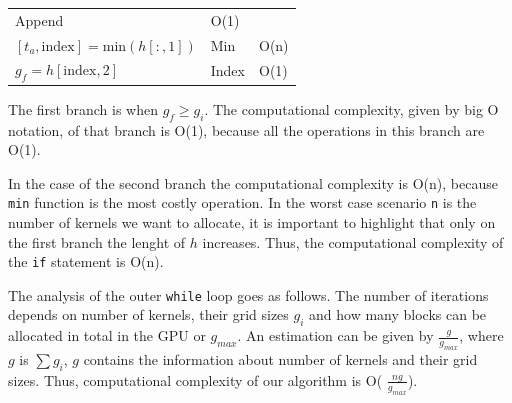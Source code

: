 \documentclass[
  12pt,
  a4paperpaper,
]{report}
\begin{document}
\begin{longtable}[]{@{}lll@{}}
\begin{minipage}[t]{0.24\columnwidth}
Append\strut
\end{minipage} & \begin{minipage}[t]{0.15\columnwidth}\raggedright
O(1)\strut
\end{minipage}\tabularnewline
\begin{minipage}[t]{0.52\columnwidth}\raggedright
\([ t_a, \mathrm{index}] = \mathrm{min}( h[:,1] )\)\strut
\end{minipage} & \begin{minipage}[t]{0.24\columnwidth}\raggedright
Min\strut
\end{minipage} & \begin{minipage}[t]{0.15\columnwidth}\raggedright
O(n)\strut
\end{minipage}\tabularnewline
\begin{minipage}[t]{0.52\columnwidth}\raggedright
\(g_f = h[ \mathrm{index}, 2]\)\strut
\end{minipage} & \begin{minipage}[t]{0.24\columnwidth}\raggedright
Index\strut
\end{minipage} & \begin{minipage}[t]{0.15\columnwidth}\raggedright
O(1)\strut
\end{minipage}\tabularnewline
\bottomrule
\end{longtable}

The first branch is when \(g_f \geq g_i\). The computational complexity,
given by big O notation, of that branch is O(1), because all the
operations in this branch are O(1).

In the case of the second branch the computational complexity is O(n),
because \texttt{min} function is the most costly operation. In the worst
case scenario \texttt{n} is the number of kernels we want to allocate,
it is important to highlight that only on the first branch the lenght of
\(h\) increases. Thus, the computational complexity of the \texttt{if}
statement is O(n).

The analysis of the outer \texttt{while} loop goes as follows. The number of iterations
depends on number of kernels, their grid sizes \(g_i\) and how many
blocks can be allocated in total in the GPU or \(g_{max}\). An
estimation can be given by \(\frac{g}{g_{max}}\), where \(g\) is
\(\sum g_i\), \(g\) contains the information about number of kernels and
their grid sizes. Thus, computational complexity of our algorithm is O(
\(\frac{ng}{g_{max}}\)).
\end{document}

